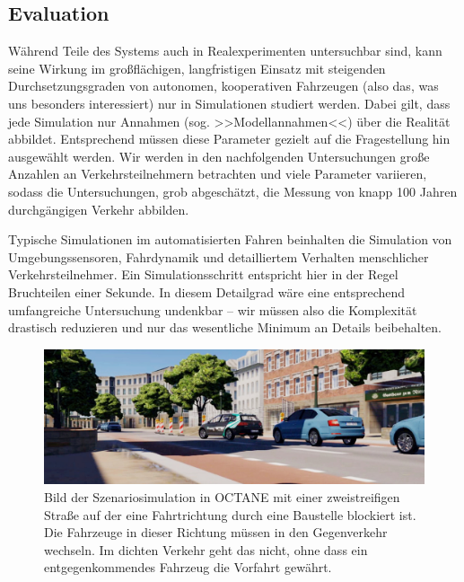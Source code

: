 \subsection{Evaluation}\label{sec:evaluation}

Während Teile des Systems auch in Realexperimenten untersuchbar sind, kann seine Wirkung im großflächigen, langfristigen Einsatz mit steigenden Durchsetzungsgraden von autonomen, kooperativen Fahrzeugen (also das, was uns besonders interessiert) nur in Simulationen studiert werden. Dabei gilt, dass jede Simulation nur Annahmen (sog. >>Modellannahmen<<) über die Realität abbildet. Entsprechend müssen diese Parameter gezielt auf die Fragestellung hin ausgewählt werden. Wir werden in den nachfolgenden Untersuchungen große Anzahlen an Verkehrsteilnehmern betrachten und viele Parameter variieren, sodass die Untersuchungen, grob abgeschätzt, die Messung von knapp 100 Jahren durchgängigen Verkehr abbilden.


Typische Simulationen im automatisierten Fahren beinhalten die Simulation von Umgebungssensoren, Fahrdynamik und detailliertem Verhalten menschlicher Verkehrsteilnehmer. Ein Simulationsschritt entspricht hier in der Regel Bruchteilen einer Sekunde. In diesem Detailgrad wäre eine entsprechend umfangreiche Untersuchung undenkbar -- wir müssen also die Komplexität drastisch reduzieren und nur das wesentliche Minimum an Details beibehalten.



\begin{figure}
\includegraphics[width=\columnwidth]{content/bottleneck/images/octane-bottleneck}%
\caption[]{Bild der Szenariosimulation in OCTANE\footnotemark{} mit einer zweistreifigen Straße auf der eine Fahrtrichtung durch eine Baustelle blockiert ist. Die Fahrzeuge in dieser Richtung müssen in den Gegenverkehr wechseln. Im dichten Verkehr geht das nicht, ohne dass ein entgegenkommendes Fahrzeug die Vorfahrt gewährt.}%
\label{fig:octane}
\end{figure}






